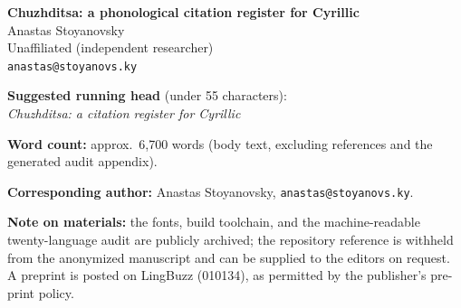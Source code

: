 \documentclass[12pt]{article}
\begin{document}
\begin{center}
{\LARGE\bfseries Chuzhditsa: a phonological citation register for Cyrillic}\\[2em]
{\large Anastas Stoyanovsky}\\[0.5em]
Unaffiliated (independent researcher)\\
\texttt{anastas@stoyanovs.ky}
\end{center}
\vspace{2em}
\noindent\textbf{Suggested running head} (under 55 characters):\\
\emph{Chuzhditsa: a citation register for Cyrillic}
\medskip

\noindent\textbf{Word count:} approx.\ 6{,}700 words (body text, excluding references and the generated audit appendix).
\medskip

\noindent\textbf{Corresponding author:} Anastas Stoyanovsky, \texttt{anastas@stoyanovs.ky}.
\medskip

\noindent\textbf{Note on materials:} the fonts, build toolchain, and the machine-readable twenty-language audit are publicly archived; the repository reference is withheld from the anonymized manuscript and can be supplied to the editors on request. A preprint is posted on LingBuzz (010134), as permitted by the publisher's pre-print policy.
\end{document}
